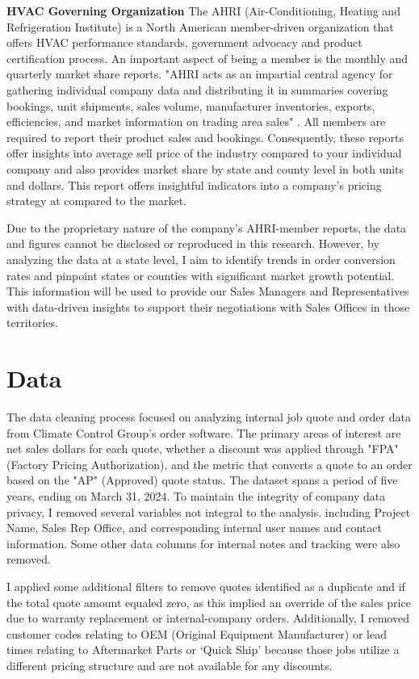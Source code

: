 \documentclass[12pt,english]{article}
\begin{document}
\textbf{HVAC Governing Organization}
The AHRI (Air-Conditioning, Heating and Refrigeration Institute) is a North American member-driven organization that offers HVAC performance standards, government advocacy and product certification process. An important aspect of being a member is the monthly and quarterly market share reports. "AHRI acts as an impartial central agency for gathering individual company data and distributing it in summaries covering bookings, unit shipments, sales volume, manufacturer inventories, exports, efficiencies, and market information on trading area sales" \cite{2}. All members are required to report their product sales and bookings. Consequently, these reports offer insights into average sell price of the industry compared to your individual company and also provides market share by state and county level in both units and dollars. This report offers insightful indicators into a company's pricing strategy at compared to the market.

Due to the proprietary nature of the company's AHRI-member reports, the data and figures cannot be disclosed or reproduced in this research. However, by analyzing the data at a state level, I aim to identify trends in order conversion rates and pinpoint states or counties with significant market growth potential. This information will be used to provide our Sales Managers and Representatives with data-driven insights to support their negotiations with Sales Offices in those territories. 


\section{Data}
The data cleaning process focused on analyzing internal job quote and order data from Climate Control Group's order software.\cite{3} The primary areas of interest are net sales dollars for each quote, whether a discount was applied through "FPA" (Factory Pricing Authorization), and the metric that converts a quote to an order based on the "AP"  (Approved) quote status. The dataset spans a period of five years, ending on March 31, 2024. To maintain the integrity of company data privacy, I removed several variables not integral to the analysis. including Project Name, Sales Rep Office, and corresponding internal user names and contact information. Some other data columns for internal notes and tracking were also removed.

I applied some additional filters to remove quotes identified as a duplicate and if the total quote amount equaled zero, as this implied an override of the sales price due to warranty replacement or internal-company orders. Additionally, I removed customer codes relating to OEM (Original Equipment Manufacturer) or lead times relating to Aftermarket Parts or  ‘Quick Ship’ because those jobs utilize a different pricing structure and are not available for any discounts.
\end{document}
